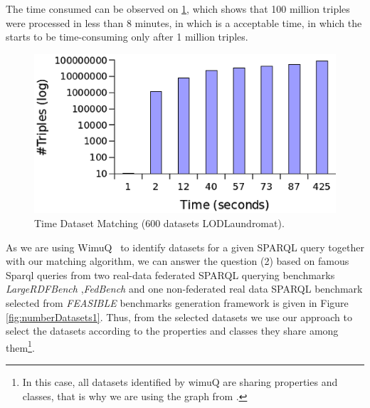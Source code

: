 \documentclass[sw]{iosart2x}
\begin{document}
The time consumed can be observed on \cref{fig:time600Laundromat}, which shows that 100 million triples were processed in less than 8 minutes, in which is a acceptable time, in which the starts to be time-consuming only after 1 million triples.

\begin{figure}[htb] 
	\centering
	\includegraphics[width=\linewidth]{img/time.png}
	\caption{Time Dataset Matching (600 datasets LODLaundromat).}
	\label{fig:time600Laundromat}
\end{figure}

As we are using WimuQ~\cite{valdestilhas2019more} to identify datasets for a given SPARQL query together with our matching algorithm, we can answer the question (2) based on famous Sparql queries from two real-data federated SPARQL querying benchmarks \emph{LargeRDFBench} \cite{largerdfbench2017},\emph{FedBench} \cite{fedbench2011} and one non-federated real data SPARQL benchmark selected from \emph{FEASIBLE} \cite{feasible2015} benchmarks generation framework is given in Figure \ref{fig:numberDatasets1}. Thus, from the selected datasets we use our approach to select the datasets according to the properties and classes they share among them\footnote{In this case, all datasets identified by wimuQ are sharing properties and classes, that is why we are using the graph from \cite{valdestilhas2019more}.}.

\end{document}
